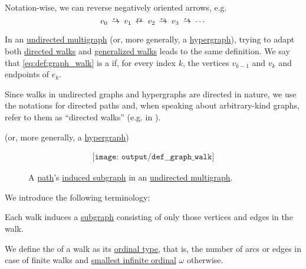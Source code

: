 \begin{definition}
\begin{thmenum}[series=def:graph_walk]
    Notation-wise, we can reverse negatively oriented arrows, e.g.
    \begin{equation*}
      v_0 \reloset {e_1} \to v_1 \reloset {e_2} \leftarrow v_2 \reloset {e_3} \to v_3 \reloset {e_4} \to \cdots
    \end{equation*}

     In an \hyperref[def:hypergraph/multigraph]{undirected multigraph} (or, more generally, a \hyperref[def:hypergraph]{hypergraph}), trying to adapt both \hyperref[def:graph_walk/directed]{directed walks} and \hyperref[def:graph_walk/generalized]{generalized walks} leads to the same definition. We say that \eqref{eq:def:graph_walk} is a  if, for every index \( k \), the vertices \( v_{k-1} \) and \( v_k \) and endpoints of \( e_k \).

    Since walks in undirected graphs and hypergraphs are directed in nature, we use the notations for directed paths and, when speaking about arbitrary-kind graphs, refer to them as \enquote{directed walks} (e.g. in ).

    (or, more generally, a \hyperref[def:hypergraph]{hypergraph})
  \end{thmenum}

  \begin{figure}[!ht]
    \begin{equation}\label{eq:fig:def:graph_walk}
      \begin{aligned}
        \texttt{[image: output/def\_\_graph\_walk]}
      \end{aligned}
    \end{equation}
    \caption{A \hyperref[def:graph_walk/path]{path}'s \hyperref[def:graph_walk/subgraph]{induced subgraph} in an \hyperref[def:hypergraph/multigraph]{undirected multigraph}.}\label{fig:def:graph_walk}
  \end{figure}

  We introduce the following terminology:
  \begin{thmenum}[resume=def:graph_walk]
     Each walk induces a \hyperref[def:directed_multigraph/subgraph]{subgraph} consisting of only those vertices and edges in the walk.

     We define the  of a walk as its \hyperref[thm:well_ordered_order_type_existence]{ordinal type}, that is, the number of arcs or edges in case of finite walks and \hyperref[thm:omega_is_an_ordinal]{smallest infinite ordinal} \( \omega \) otherwise.


\end{thmenum}
\end{definition}
